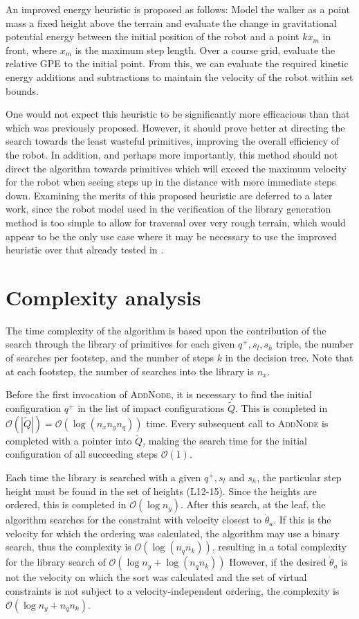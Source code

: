 An improved energy heuristic is proposed as follows: Model the walker as a point mass a fixed height above the terrain and evaluate the change in gravitational potential energy between the initial position of the robot and a point $kx_m$ in front, where $x_m$ is the maximum step length. Over a course grid, evaluate the relative GPE to the initial point. From this, we can evaluate the required kinetic energy additions and subtractions to maintain the velocity of the robot within set bounds.
	
One would not expect this heuristic to be significantly more efficacious than that which was previously proposed. However, it should prove better at directing the search towards the least wasteful primitives, improving the overall efficiency of the robot. In addition, and perhaps more importantly, this method should not direct the algorithm towards primitives which will exceed the maximum velocity for the robot when seeing steps up in the distance with more immediate steps down. Examining the merits of this proposed heuristic are deferred to a later work, since the robot model used in the verification of the library generation method is too simple to allow for traversal over very rough terrain, which would appear to be the only use case where it may be necessary to use the improved heuristic over that already tested in \cite{manchester13planning}.

\section{Complexity analysis} \label{sec:complexity}
The time complexity of the algorithm is based upon the contribution of the search through the library of primitives for each given $q^+,s_l,s_h$ triple, the number of searches per footstep, and the number of steps $k$ in the decision tree. Note that at each footstep, the number of searches into the library is $n_x$.

Before the first invocation of \textsc{AddNode}, it is necessary to find the initial configuration $q^+$ in the list of impact configurations $\tilde{Q}$. This is completed in $\mathcal{O}(|\tilde{Q}|)=\mathcal{O}(\log(n_xn_yn_q))$ time. Every subsequent call to \textsc{AddNode} is completed with a pointer into $\tilde{Q}$, making the search time for the initial configuration of all succeeding steps $\mathcal{O}(1)$.

Each time the library is searched with a given $q^+,s_l$ and $s_h$, the particular step height must be found in the set of heights (L12-15). Since the heights are ordered, this is completed in $\mathcal{O}(\log n_y)$. After this search, at the leaf, the algorithm searches for the constraint with velocity closest to $\dot{\theta}_a$. If this is the velocity for which the ordering was calculated, the algorithm may use a binary search, thus the complexity is $\mathcal{O}(\log(n_qn_k))$, resulting in a total complexity for the library search of $\mathcal{O}(\log n_y+\log(n_qn_k))$ However, if the desired $\dot{\theta}_a$ is not the velocity on which the sort was calculated and the set of virtual constraints is not subject to a velocity-independent ordering, the complexity is $\mathcal{O}(\log n_y +n_qn_k)$.

